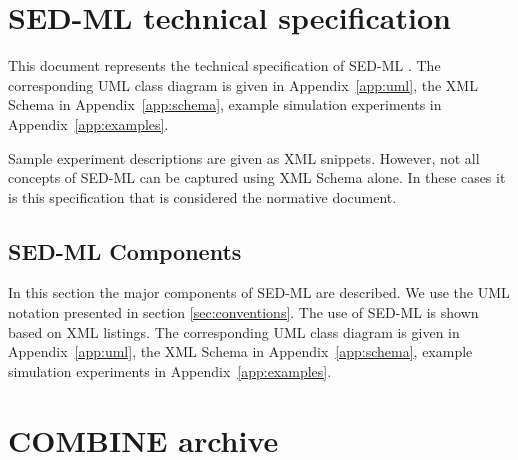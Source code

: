 \documentclass[pdftex,rgb,dvipsnames,svgnames,hyperref,table]{report}
\begin{document}

\tableofcontents
\newpage


\chapter{SED-ML technical specification}
\label{chp:specification}

This document represents the technical specification of SED-ML \currentLV. The corresponding UML class diagram is given in Appendix~\ref{app:uml}, the XML Schema in Appendix~\ref{app:schema}, example simulation experiments in Appendix~\ref{app:examples}.

Sample experiment descriptions are given as XML snippets. However, not all concepts of SED-ML can be captured using XML Schema alone. In these cases it is this specification that is considered the normative document. 








\section{SED-ML Components}
\label{sec:components}
In this section the major components of SED-ML are described. We use the UML notation presented in section \ref{sec:conventions}. The use of SED-ML is shown based on XML listings. The corresponding UML class diagram is given in Appendix~\ref{app:uml}, the XML Schema in Appendix~\ref{app:schema}, example simulation experiments in Appendix~\ref{app:examples}.









\chapter{COMBINE archive}
\label{chp:archive}
\end{document}
